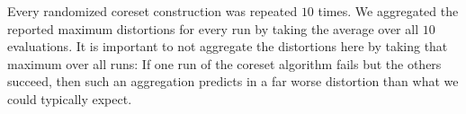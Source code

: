 Every randomized coreset construction was repeated $10$ times. We aggregated the reported maximum distortions for every run by taking the average over all $10$ evaluations. 
It is important to not aggregate the distortions here by taking that maximum over all runs: If one run of the coreset algorithm fails but the others succeed, then such an aggregation predicts in a far worse distortion than what we could typically expect.







